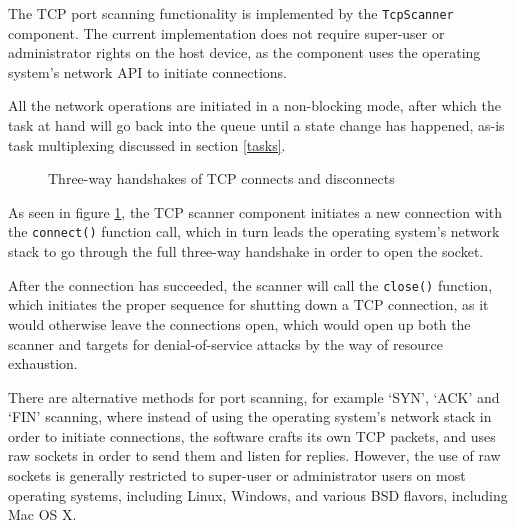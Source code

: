 \documentclass[a4paper,12pt]{article}
\begin{document}
	The TCP port scanning functionality is implemented by the \texttt{TcpScanner} component. The current implementation does not require super-user or administrator rights on the host device, as the component uses the operating system's network API to initiate connections.
	
	All the network operations are initiated in a non-blocking mode, after which the task at hand will go back into the queue until a state change has happened, as-is task multiplexing discussed in section \ref{tasks}.

	\begin{figure}[!htbp]
		\centering
		\caption{Three-way handshakes of TCP connects and disconnects}
		\label{tcp3way}
	\end{figure}
	
	As seen in figure \ref{tcp3way}, the TCP scanner component initiates a new connection with the \texttt{connect()} function call, which in turn leads the operating system's network stack to go through the full three-way handshake in order to open the socket.
	
	After the connection has succeeded, the scanner will call the \texttt{close()} function, which initiates the proper sequence for shutting down a TCP connection, as it would otherwise leave the connections open, which would open up both the scanner and targets for denial-of-service attacks by the way of resource exhaustion\cite{erickson08}.
	
	There are alternative methods for port scanning, for example `SYN', `ACK' and `FIN' scanning\cite{kris07}, where instead of using the operating system's network stack in order to initiate connections, the software crafts its own TCP packets, and uses raw sockets in order to send them and listen for replies. However, the use of raw sockets is generally restricted to super-user or administrator users on most operating systems, including Linux, Windows, and various BSD flavors, including Mac OS X.
	
\end{document}

